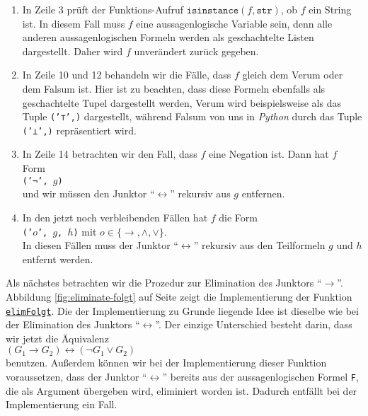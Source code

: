\begin{enumerate}
\item In Zeile 3 prüft der Funktions-Aufruf $\texttt{isinstance}(f, \mathtt{str})$, ob $f$ ein String ist.  In diesem Fall
      muss $f$ eine aussagenlogische Variable sein, denn alle anderen aussagenlogischen Formeln werden als
      geschachtelte Listen dargestellt.  Daher wird $f$ unverändert zurück gegeben.
\item In Zeile 10 und 12 behandeln wir die Fälle, dass $f$ gleich dem Verum oder dem Falsum ist.
      Hier ist zu beachten, dass diese Formeln ebenfalls als geschachtelte Tupel dargestellt werden,
      Verum wird beispielsweise als das Tuple \texttt{('⊤',)} dargestellt, während Falsum von uns in
      \textsl{Python} durch das Tuple \texttt{('⊥',)} repräsentiert wird.
\item In Zeile 14 betrachten wir den Fall, dass $f$ eine Negation ist.  Dann hat $f$ Form
      \\[0.2cm]
      \hspace*{1.3cm}
      \texttt{('¬', $g$)}  
      \\[0.2cm]
      und wir müssen den Junktor ``$\leftrightarrow$'' rekursiv aus $g$ entfernen.
\item In den jetzt noch verbleibenden Fällen hat $f$ die Form
      \\[0.2cm]
      \hspace*{1.3cm}
      \texttt{('$o$', $g$, $h$)}  \quad mit $o \in \{\rightarrow, \wedge, \vee\}$.
      \\[0.2cm]
      In diesen Fällen muss der Junktor ``$\leftrightarrow$'' rekursiv aus den Teilformeln $g$ und $h$ entfernt
      werden. 
\end{enumerate}


Als nächstes betrachten wir die Prozedur zur Elimination des Junktors ``$\rightarrow$''. 
Abbildung
\ref{fig:eliminate-folgt} auf Seite \pageref{fig:eliminate-folgt} zeigt die
Implementierung der Funktion
\href{https://github.com/karlstroetmann/Logik/blob/master/SetlX/knf.stlx}{\texttt{elimFolgt}}.
Die der Implementierung zu Grunde liegende Idee ist dieselbe wie bei der Elimination des
Junktors ``$\leftrightarrow$''.  Der einzige Unterschied besteht darin, dass wir jetzt die
Äquivalenz \\[0.2cm]
\hspace*{1.3cm} $(G_1 \rightarrow G_2) \leftrightarrow (\neg G_1 \vee G_2)$ \\[0.2cm]
benutzen.  Außerdem können wir bei der Implementierung dieser Funktion voraussetzen, dass der Junktor ``$\leftrightarrow$''
bereits aus der aussagenlogischen Formel \texttt{F}, die als Argument übergeben wird, eliminiert worden ist.
Dadurch entfällt bei der Implementierung ein Fall. 

